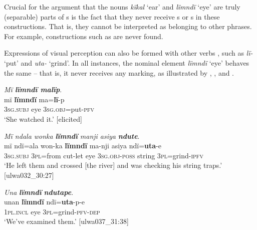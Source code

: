 Crucial for the argument that the nouns \textit{kïkal} ‘ear’ and \textit{lïmndï} ‘eye’ are truly (separable) parts of s is the fact that they never receive s or s in these constructions. That is, they cannot be interpreted as belonging to other phrases. For example, constructions such as  are never found.

\z

Expressions of visual perception can also be formed with other verbs , such as \textit{lï-} ‘put’ and \textit{uta-} ‘grind’. In all instances, the nominal element \textit{lïmndï} ‘eye’ behaves the same -- that is, it never receives any  marking, as illustrated by , , and .

\ea%
    \label{ex:phrase:66}
          \textit{Mï \textbf{lïmndï malïp}}.\\
\gll mï      \textbf{lïmndï}  ma=\textbf{lï}{}-p\\
    3\textsc{sg.subj}  eye    3\textsc{sg.obj}=put-\textsc{pfv}\\
\glt `She watched it.’ [elicited]
\z

\ea%
    \label{ex:phrase:67}
          \textit{Mï ndala wonka} \textbf{\textit{lïmndï}} \textit{manji asiya} \textbf{\textit{ndute}}.\\
\gll mï      ndï=ala  won-ka  \textbf{lïmndï}  ma-nji      asiya     ndï=\textbf{uta}{}-e\\
    3\textsc{sg.subj}  3\textsc{pl}=from  cut-let    eye    3\textsc{sg.obj-poss}  string    3\textsc{pl}=grind-\textsc{ipfv}\\
\glt `He left them and crossed [the river] and was checking his string traps.’ [ulwa032\_30:27]
\z

\ea%
    \label{ex:phrase:68}
          \textit{Una} \textbf{\textit{lïmndï}} \textbf{\textit{ndutape}}.\\
\gll unan    \textbf{lïmndï}  ndï=\textbf{uta}{}-p-e\\
    1\textsc{pl.incl}  eye    3\textsc{pl}=grind-\textsc{pfv-dep}\\
\glt `We’ve examined them.’ [ulwa037\_31:38]
\z

